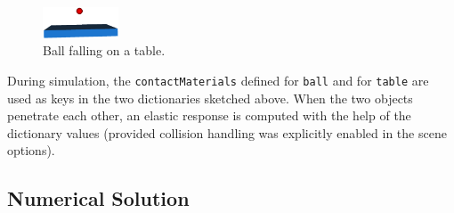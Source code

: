 %
\begin{figure}[htb]
	\centering
	\includegraphics[width=0.2\textwidth]{figures/bouncingBall.png}
	\caption{Ball falling on a table.}
	\label{fig:bouncingBall}
\end{figure}
%
During simulation, the \texttt{contactMaterials} defined for
\texttt{ball} and for \texttt{table} are used as keys in the two
dictionaries sketched above. 
When the two objects penetrate each other,
an elastic response is computed with the help of the dictionary values 
(provided collision handling was explicitly enabled in the scene options).

\subsection{Numerical Solution}\label{sec:numericSolution}

\newcommand{\bvec}[1]{\bm{#1}}

